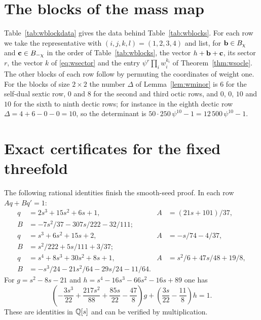 \section{The blocks of the mass map}\label{app:wblocks}

Table~\ref{tab:wblockdata} gives the data behind Table~\ref{tab:wblocks}.
For each row we take the representative with $(i,j,k,l)=(1,2,3,4)$ and
list, for $\mathbf{b}\in B_\chi$ and $\mathbf{c}\in B_{-\chi}$ in the order of
Table~\ref{tab:wblocks}, the vector $h+\mathbf{b}+\mathbf{c}$, its sector $r$, the vector
$k$ of \eqref{eq:wsector} and the entry $\psi^r\prod_iw_i^{k_i}$ of
Theorem~\ref{thm:wsocle}. The other blocks of each row follow by permuting
the coordinates of weight one. For the blocks of size $2\times2$ the number
$\Delta$ of Lemma~\ref{lem:wminor} is $6$ for the self-dual sextic row, $0$
and $8$ for the second and third octic rows, and $0$, $0$, $10$ and $10$ for
the sixth to ninth dectic rows; for instance in the eighth dectic row
$\Delta=4+6-0-0=10$, so the determinant is
$50\cdot250\,\psi^{10}-1=12\,500\,\psi^{10}-1$.




\clearpage

\section{Exact certificates for the fixed threefold}\label{app:certificates}
The following rational identities finish the smooth-seed proof.
In each row $Aq+Bq'=1$:
\begin{align*}
q&=2s^3+15s^2+6s+1,&
A&=(21s+101)/37,\\
B&=-7s^2/37-307s/222-32/111;\\[2pt]
q&=s^3+6s^2+15s+2,&
A&=-s/74-4/37,\\
B&=s^2/222+5s/111+3/37;\\[2pt]
q&=s^4+8s^3+30s^2+8s+1,&
A&=s^2/6+47s/48+19/8,\\
B&=-s^3/24-21s^2/64-29s/24-11/64.
\end{align*}
For $g=s^2-8s-21$ and $h=s^4-16s^3-66s^2-16s+89$ one has
\[
 \left(-\frac{3s^3}{22}+\frac{217s^2}{88}
       +\frac{85s}{22}-\frac{47}{8}\right)g
 +\left(\frac{3s}{22}-\frac{11}{8}\right)h=1.
\]
These are identities in $\mathbb{Q}[s]$ and can be verified by multiplication.

